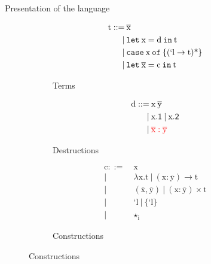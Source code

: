 \documentclass[xcolor=svgnames,11pt]{beamer}
\begin{document}
\begin{frame}[shrink]{Presentation of the language}
\begin{figure}[!h]
  \begin{subfigure}[b]{0.3\linewidth{}}
    \begin{align*}
      \ensuremath{\text{t}} ::=\:&\ensuremath{\overline{\text{x}}}\\ |\:&\ensuremath{\text{\texttt{let}}\:\text{x}=\text{d}\:\text{\texttt{in}}\:\text{t}}\\ |\:&\ensuremath{\text{\texttt{case}}\:\text{x}\:\text{\texttt{of}}\:\{\text{\ensuremath{(\text{`l}\to{}\text{t})}\ensuremath{\text{*}}}\}}\\ |\:&\ensuremath{\text{\texttt{let}}\:\overline{\text{x}}=\text{c}\:\text{\texttt{in}}\:\text{t}}
    \end{align*}
    \caption{Terms}
  \end{subfigure}
  \begin{subfigure}[b]{0.25\linewidth{}}
    \begin{align*}
      \ensuremath{\text{d}} ::=\:&\ensuremath{\text{x}} \: \ensuremath{\overline{\text{y}}}\\ |\:&\ensuremath{\text{x}\mathsf{.1}} \: | \: \ensuremath{\text{x}\mathsf{.2}} \\ |\:&\textcolor{red}{\ensuremath{\overline{\text{x}}:\overline{\text{y}}}}
    \end{align*}
    \caption{Destructions}
  \end{subfigure}
  \begin{subfigure}[b]{0.3\linewidth{}}
    \begin{align*}
      \ensuremath{\text{c}} ::=\:&\ensuremath{\text{x}}\\|\:&\ensuremath{\lambda{{}}} \ensuremath{\text{x}} . \ensuremath{\text{t}}\:|\:\ensuremath{(\text{x}:\overline{\text{y}})\to{}\text{t}}\\|\:&(\ensuremath{\overline{\text{x}}},\ensuremath{\overline{\text{y}}})\:|\:\ensuremath{(\text{x}:\overline{\text{y}})\times{}\text{t}}\\|\:&\ensuremath{\text{`l}}\:|\:\ensuremath{\{\text{`l}\}}\\|\:&\ensuremath{\star{}} \ensuremath{_{\text{i}}}
    \end{align*}\caption{Constructions}
  \end{subfigure}
\end{figure}
\end{frame}
\end{document}
